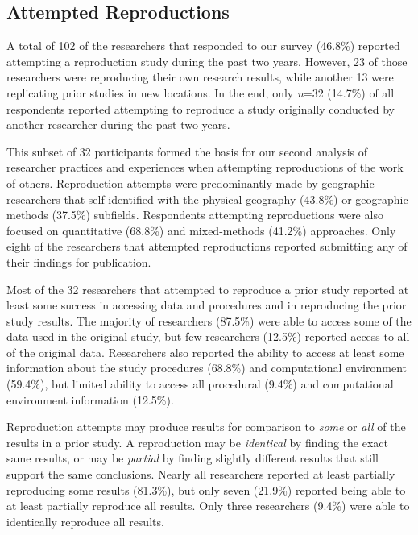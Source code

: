\documentclass[]{interact}
\theoremstyle{plain}%
\theoremstyle{definition}
\theoremstyle{remark}
\begin{document}
\subsection*{Attempted Reproductions}
A total of 102 of the researchers that responded to our survey (46.8\%) reported attempting a reproduction study during the past two years.
However, 23 of those researchers were reproducing their own research results, while another 13 were replicating prior studies in new locations.
In the end, only \textit{n}=32 (14.7\%) of all respondents reported attempting to reproduce a study originally conducted by another researcher during the past two years.

This subset of 32 participants formed the basis for our second analysis of researcher practices and experiences when attempting reproductions of the work of others.
Reproduction attempts were predominantly made by geographic researchers that self-identified with the physical geography (43.8\%) or geographic methods (37.5\%) subfields.
Respondents attempting reproductions were also focused on quantitative (68.8\%) and mixed-methods (41.2\%) approaches. 
Only eight of the researchers that attempted reproductions reported submitting any of their findings for publication.

Most of the 32 researchers that attempted to reproduce a prior study reported at least some success in accessing data and procedures and in reproducing the prior study results.   
The majority of researchers (87.5\%) were able to access some of the data used in the original study, but few researchers (12.5\%) reported access to all of the original data.
Researchers also reported the ability to access at least some information about the study procedures (68.8\%) and computational environment (59.4\%), but limited ability to access all procedural (9.4\%) and computational environment information (12.5\%). 

Reproduction attempts may produce results for comparison to \textit{some} or \textit{all} of the results in a prior study.
A reproduction may be \textit{identical} by finding the exact same results, or may be \textit{partial} by finding slightly different results that still support the same conclusions.
Nearly all researchers reported at least partially reproducing some results (81.3\%), but only seven (21.9\%) reported being able to at least partially reproduce all results.
Only three researchers (9.4\%) were able to identically reproduce all results.  
\end{document}
